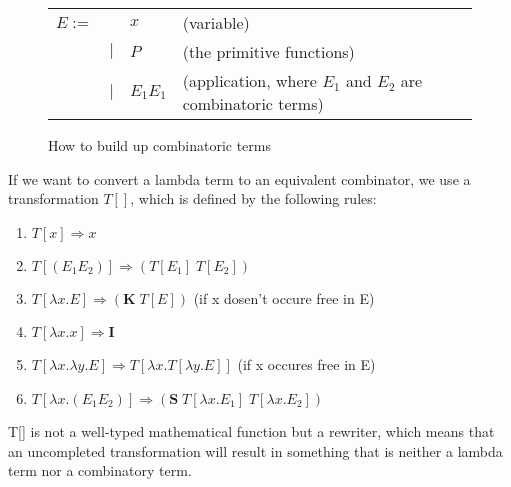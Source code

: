 \begin{figure}[]
    \centering
    \begin{tabular}{l l l l}
         $E :=$&  & $x$ & (variable)\\
         & $|$ & $P$ & (the primitive functions) \\
         & $|$ & $E_1 E_1$ & (application, where $E_1$ and $E_2$ are combinatoric terms)\\
    \end{tabular}
    \caption{How to build up combinatoric terms}
    \label{fig:makeCombinatoricTerms}
\end{figure}

\para
If we want to convert a lambda term to an equivalent combinator, we use a transformation $T[]$, which is defined by the following rules:
\begin{enumerate}
    \item $T[x] \Rightarrow x$
    \item $T[(E_1 E_2)] \Rightarrow (T[E_1]\; T[E_2])$
    \item $T[\lambda x.E] \Rightarrow (\textbf{K}\; T[E])$ (if x dosen't occure free in E)
    \item $T[\lambda x.x]\Rightarrow \textbf{I}$
    \item $T[\lambda x. \lambda y.E]\Rightarrow T[\lambda x.T[\lambda y.E]]$ (if x occures free in E)
    \item $T[\lambda x.(E_1 E_2)] \Rightarrow (\textbf{S} \; T[\lambda x.E_1] \; T[\lambda x.E_2])$
\end{enumerate}
T[] is not a well-typed mathematical function but a rewriter, which means that an uncompleted transformation will result in something that is neither a lambda term nor a combinatory term. 

